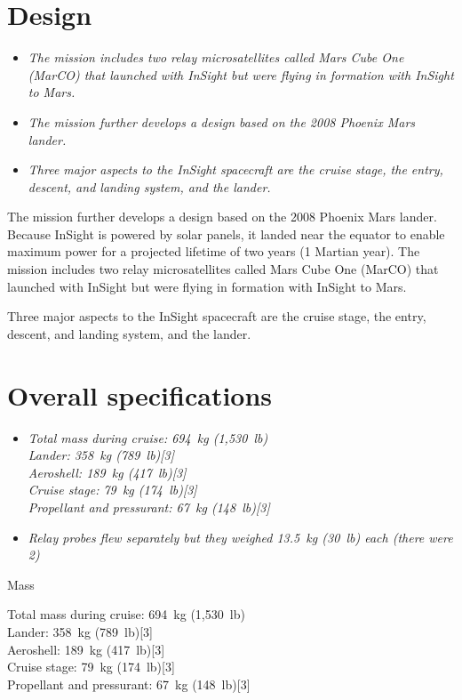 \section{Design}\label{design}

\begin{itemize}
\item
  \emph{The mission includes two relay microsatellites called Mars Cube
  One (MarCO) that launched with InSight but were flying in formation
  with InSight to Mars.}
\item
  \emph{The mission further develops a design based on the 2008 Phoenix
  Mars lander.}
\item
  \emph{Three major aspects to the InSight spacecraft are the cruise
  stage, the entry, descent, and landing system, and the lander.}
\end{itemize}

The mission further develops a design based on the 2008 Phoenix Mars
lander. Because InSight is powered by solar panels, it landed near the
equator to enable maximum power for a projected lifetime of two years (1
Martian year). The mission includes two relay microsatellites called
Mars Cube One (MarCO) that launched with InSight but were flying in
formation with InSight to Mars.

Three major aspects to the InSight spacecraft are the cruise stage, the
entry, descent, and landing system, and the lander.

\section{Overall specifications}\label{overall-specifications}

\begin{itemize}
\item
  \emph{Total mass during cruise: 694~kg (1,530~lb)\\
  Lander: 358~kg (789~lb){[}3{]}\\
  Aeroshell: 189~kg (417~lb){[}3{]}\\
  Cruise stage: 79~kg (174~lb){[}3{]}\\
  Propellant and pressurant: 67~kg (148~lb){[}3{]}}
\item
  \emph{Relay probes flew separately but they weighed 13.5~kg (30~lb)
  each (there were 2)}
\end{itemize}

Mass

Total mass during cruise: 694~kg (1,530~lb)\\
Lander: 358~kg (789~lb){[}3{]}\\
Aeroshell: 189~kg (417~lb){[}3{]}\\
Cruise stage: 79~kg (174~lb){[}3{]}\\
Propellant and pressurant: 67~kg (148~lb){[}3{]}

